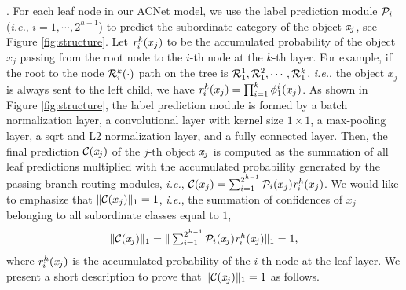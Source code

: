 \documentclass[10pt,twocolumn,letterpaper]{article}
\def\ie{{\em i.e.}}
\begin{document}
{.} For each leaf node in our ACNet model, we use the label prediction module ${\cal P}_i$ (\ie, $i=1,\cdots, 2^{h-1}$) to predict the subordinate category of the object ${\it x}_j$, see Figure \ref{fig:structure}. Let ${\it r}_i^{k}(x_j)$ to be the accumulated probability of the object $x_j$ passing from the root node to the $i$-th node at the $k$-th layer. For example, if the root to the node ${\cal R}_{i}^{k}(\cdot)$ path on the tree is ${\cal R}_{1}^{1}, {\cal R}_{1}^{2}, \cdots, {\cal R}_{1}^{k}$, \ie, the object $x_j$ is always sent to the left child, we have ${\it r}_{i}^{k}(x_j) = \prod_{i=1}^{k}\phi_{1}^{i}(x_j)$. As shown in Figure \ref{fig:structure}, the label prediction module is formed by a batch normalization layer, a convolutional layer with kernel size $1\times1$, a max-pooling layer, a sqrt and L2 normalization layer, and a fully connected layer. Then, the final prediction  ${\cal C}({\it x}_j)$ of the $j$-th object ${\it x}_j$ is computed as the summation of all leaf predictions multiplied with the accumulated probability generated by the passing branch routing modules, \ie, ${\cal C}(x_j)=\sum_{i=1}^{2^{h-1}}{\cal P}_i(x_j){\it r}_i^{h}(x_j)$. We would like to emphasize that $\|{\cal C}(x_j)\|_1=1$, \ie, the summation of confidences of $x_j$ belonging to all subordinate classes equal to $1$,
\begin{equation}
\begin{array}{cl}
\|{\cal C}({\it x}_j)\|_1 = \|\sum_{i=1}^{2^{h-1}}{{\cal P}_i({\it x}_j)}{\it r}_i^{h}({\it x}_j)\|_1 = 1,
\end{array}
\end{equation}
where ${\it r}_i^{h}({\it x}_j)$ is the accumulated probability of the $i$-th node at the leaf layer. We present a short description to prove that $\|{\cal C}({\it x}_j)\|_1=1$ as follows.
\end{document}

